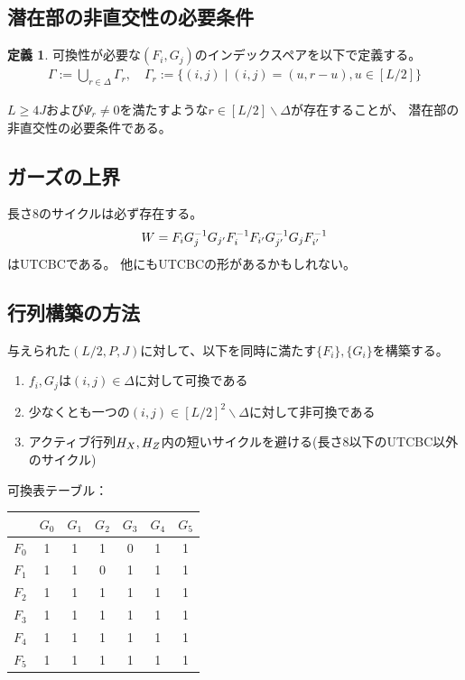 \documentclass[a4paper,11pt,dvipdfmx]{jsarticle}
\theoremstyle{definition}
\newtheorem{definition}{定義}[section]
\begin{document}
\subsection{潜在部の非直交性の必要条件}
\begin{definition}\label{def:012311}
  可換性が必要な$(F_i,G_j)$のインデックスペアを以下で定義する。
  \begin{align}
    \Gamma := \bigcup_{r\in\Delta} \Gamma_r,\quad \Gamma_r := \{(i,j)\mid(i,j)=(u,r-u), u\in[L/2]\}
  \end{align}
\end{definition}
$L\geq 4J$および$\Psi_r\neq 0$を満たすような$r\in[L/2]\backslash \Delta$が存在することが、
潜在部の非直交性の必要条件である。

\subsection{ガーズの上界}
長さ8のサイクルは必ず存在する。
\begin{align}
    W=F_{i}G_j^{-1} G_{j'}F_i^{-1} F_{i'}G_{j'}^{-1} G_jF_{i'}^{-1}\label{eq:01232}
\end{align}
はUTCBCである。
他にもUTCBCの形があるかもしれない。

\subsection{行列構築の方法}
与えられた$(L/2,P,J)$に対して、以下を同時に満たす$\{F_i\},\{G_i\}$を構築する。
\begin{enumerate}[label=\Alph*', ref=\Alph*']
  \item $f_i,G_j$は$(i,j)\in\Delta$に対して可換である\label{condition:a'}
  \item 少なくとも一つの$(i,j)\in[L/2]^2\backslash\Delta$に対して非可換である\label{condition:b'}
  \item アクティブ行列$H_X,H_Z$内の短いサイクルを避ける(長さ8以下のUTCBC以外のサイクル)\label{condition:c'}
\end{enumerate}
可換表テーブル：
\begin{table}[htbp]
\centering
\begin{tabular}{c|cccccc}
      & $G_0$ & $G_1$ & $G_2$ & $G_3$ & $G_4$ & $G_5$ \\ \hline
$F_0$ & 1     & 1     & 1     & 0     & 1     & 1     \\
$F_1$ & 1     & 1     & 0     & 1     & 1     & 1     \\
$F_2$ & 1     & 1     & 1     & 1     & 1     & 1     \\
$F_3$ & 1     & 1     & 1     & 1     & 1     & 1     \\
$F_4$ & 1     & 1     & 1     & 1     & 1     & 1     \\
$F_5$ & 1     & 1     & 1     & 1     & 1     & 1     \\
\end{tabular}
\end{table}
\end{document}

